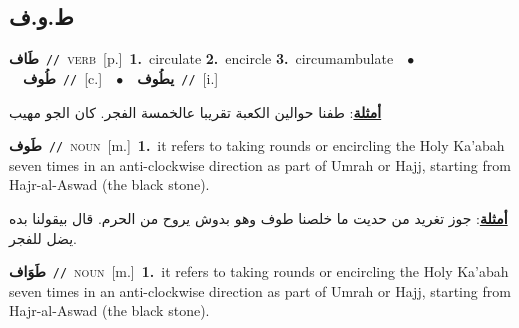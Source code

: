\documentclass[10pt,a4paper,twoside]{article} %
\begin{document}
\begin{multicols}{2}
\vspace{-3mm}
\subsection*{\color{blue}\foreignlanguage{arabic}{ط.و.ف}\color{blue}{}} 

{\setlength\topsep{0pt}\textbf{\foreignlanguage{arabic}{طَاف}}\ {\color{gray}\texttt{//}\color{black}}\ \textsc{verb}\ [p.]\ \textbf{1.}~circulate  \textbf{2.}~encircle  \textbf{3.}~circumambulate\ \ $\bullet$\ \ \setlength\topsep{0pt}\textbf{\foreignlanguage{arabic}{طُوف}}\ {\color{gray}\texttt{//}\color{black}}\ [c.]\ \ $\bullet$\ \ \setlength\topsep{0pt}\textbf{\foreignlanguage{arabic}{يطُوف}}\ {\color{gray}\texttt{//}\color{black}}\ [i.]\  \begin{flushright}\color{gray}\foreignlanguage{arabic}{\textbf{\underline{\foreignlanguage{arabic}{أمثلة}}}: طفنا حوالين الكعبة تقريبا عالخمسة الفجر. كان الجو مهيب}\end{flushright}\color{black}} \vspace{2mm}

{\setlength\topsep{0pt}\textbf{\foreignlanguage{arabic}{طَوف}}\ {\color{gray}\texttt{//}\color{black}}\ \textsc{noun}\ [m.]\ \textbf{1.}~it refers to taking rounds or encircling the Holy Ka'abah seven times in an anti-clockwise direction as part of Umrah or Hajj, starting from Hajr-al-Aswad (the black stone).\  \begin{flushright}\color{gray}\foreignlanguage{arabic}{\textbf{\underline{\foreignlanguage{arabic}{أمثلة}}}: جوز تغريد من حديت ما خلصنا طوف وهو بدوش يروح من الحرم. قال بيقولنا بده يضل للفجر.}\end{flushright}\color{black}} \vspace{2mm}

{\setlength\topsep{0pt}\textbf{\foreignlanguage{arabic}{طَوَاف}}\ {\color{gray}\texttt{//}\color{black}}\ \textsc{noun}\ [m.]\ \textbf{1.}~it refers to taking rounds or encircling the Holy Ka'abah seven times in an anti-clockwise direction as part of Umrah or Hajj, starting from Hajr-al-Aswad (the black stone).\ } \vspace{2mm}


\end{multicols}
\end{document}

